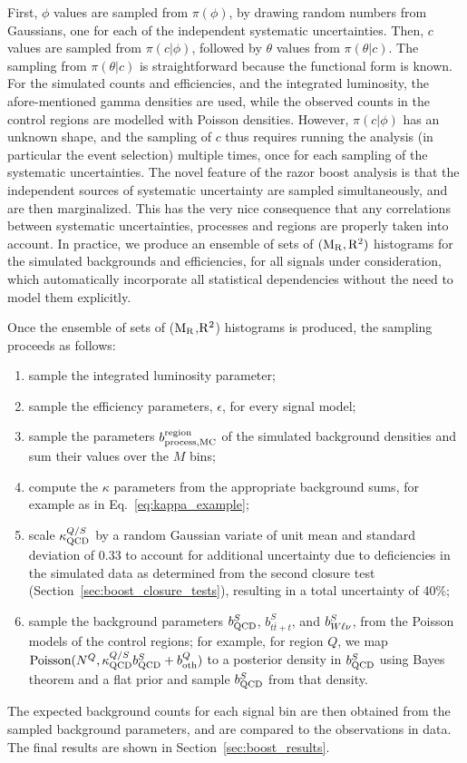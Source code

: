 First, $\phi$ values are sampled from $\pi(\phi)$, by drawing random numbers from 
Gaussians, one for each of the independent systematic uncertainties.
Then, $c$ values are sampled from $\pi(c | \phi)$, followed by $\theta$ values from $\pi(\theta |
c)$. 
The sampling from $\pi(\theta|c)$ is straightforward because the functional form is known.
For the simulated counts and efficiencies, and the integrated luminosity, the afore-mentioned gamma
densities are used, while the observed counts in the control regions are modelled with Poisson
densities.
%
However, $\pi(c | \phi)$ has an unknown shape, and the sampling of $c$ thus requires running the
analysis (in particular the event selection) multiple times, once for each sampling of the
systematic uncertainties. 
The novel feature of the razor boost analysis is that the independent sources of systematic
uncertainty are sampled simultaneously, and are then marginalized. This has the very
nice consequence that any correlations between systematic uncertainties, processes and
regions are properly taken into account. In practice, we produce an ensemble of sets of $(\mathrm{M_R},
\mathrm{R^2})$ histograms for the simulated backgrounds and efficiencies, for all
signals under consideration, which automatically incorporate all statistical dependencies
without the need to model them explicitly. 

Once the ensemble of sets of ($\mathrm{M_R}$,$\mathrm{R^2}$) histograms is produced, the sampling proceeds
as follows:
\begin{enumerate}
\item sample the integrated luminosity parameter;
\item sample the efficiency parameters, $\epsilon$, for every signal model;
\item sample the parameters $b^{\rm region}_{\rm process, MC}$ of the simulated background densities
and sum their values over the $M$ bins;
\item compute the $\kappa$ parameters from the appropriate background sums, for example as in
Eq.~\ref{eq:kappa_example};
\item scale $\kappa^{Q/S}_{\rm QCD}$ by a random Gaussian variate of unit mean and standard
deviation of 0.33 to account for additional uncertainty due to deficiencies in the
simulated data as determined from the second closure test (Section~\ref{sec:boost_closure_tests}),
resulting in a total uncertainty of 40\%;
\item sample the background parameters $b^S_{\rm QCD}$, $b^S_{t\bar{t}+t}$, and $b^S_{W\ell\nu}$,
from the Poisson models  of the control regions; for example, for region $Q$, we map 
$\textrm{Poisson}(N^Q, \kappa^{Q/S}_{\rm QCD} b^S_{\rm QCD} + b^Q_{\rm oth})$ to a posterior density
in $b^S_{\rm QCD}$ using Bayes theorem and a flat prior and sample $b^S_{\rm QCD}$ from that
density.
\end{enumerate}
The expected background counts for each signal bin are then obtained from the sampled background
parameters, and are compared to the observations in data. The final results are shown in
Section~\ref{sec:boost_results}.

